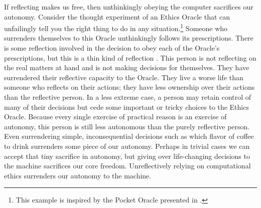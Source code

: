 \begin{isabellebody}
\begin{isamarkuptext}
If reflecting makes us free, then unthinkingly obeying the computer sacrifices our autonomy. Consider 
the thought experiment of an Ethics Oracle that can unfailingly tell you the right thing to do in any 
situation.\footnote{This example is inspired by the Pocket Oracle presented in \citet{bok}.} Someone 
who surrenders themselves to this Oracle unthinkingly follows its prescriptions. 
There is some reflection involved in the decision to obey each of the Oracle’s prescriptions, but 
this is a thin kind of reflection \citep{bok}. This person is not reflecting on the real matters at hand and is 
not making decisions for themselves. They have surrendered their reflective capacity to the Oracle. 
They live a worse life than someone who reflects on their actions; they have less ownership over their 
actions than the reflective person. In a less extreme case, a person may retain control of many of 
their decisions but cede some important or tricky choices to the Ethics Oracle. Because every single 
exercise of practical reason is an exercise of autonomy, this person is still less autonomous than the 
purely reflective person. Even surrendering simple, inconsequential decisions such as which flavor of 
coffee to drink surrenders some piece of our autonomy. Perhaps in trivial cases we can accept that 
tiny sacrifice in autonomy, but giving over life-changing decisions to the machine sacrifices our 
core freedom. Unreflectively relying on computational ethics surrenders our autonomy to the machine. 


\end{isamarkuptext}
\end{isabellebody}
